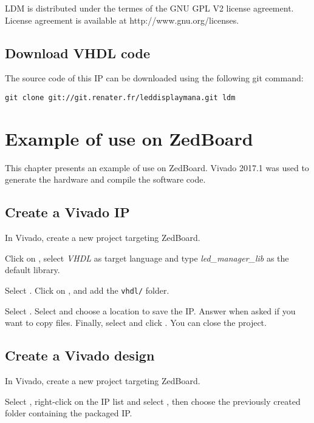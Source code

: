 \documentclass[openany,a4paper]{book}
\begin{document}
LDM is distributed under the termes of the GNU GPL V2 license agreement. 
License agreement is available at http://www.gnu.org/licenses.

\section{Download VHDL code}

The source code of this IP can be downloaded using the following git command:
\begin{verbatim}
git clone git://git.renater.fr/leddisplaymana.git ldm 
\end{verbatim}


\chapter{Example of use on ZedBoard}

This chapter presents an example of use on ZedBoard. Vivado 2017.1 was used to generate the hardware and compile the software code.


\section{Create a Vivado IP}

In Vivado, create a new project targeting ZedBoard.

Click on , select \textit{VHDL} as target language and type \textit{led\_manager\_lib} as the default library.

Select .
Click on , and add the \texttt{vhdl/} folder.

Select .
Select  and choose a location to save the IP.
Answer  when asked if you want to copy files.
Finally, select  and click .
You can close the project.

\section{Create a Vivado design}

In Vivado, create a new project targeting ZedBoard.

Select , right-click on the IP list and select , then choose the previously created folder containing the packaged IP.
\end{document}
